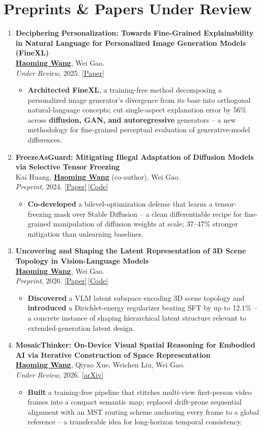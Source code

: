 \documentclass[11pt, letterpaper]{article}
\newenvironment{publist}{
  \begin{enumerate}[leftmargin=1.7em, itemsep=4pt, parsep=0pt, topsep=2pt, label=\arabic*.]
}{\end{enumerate}}
\newcommand{\impactbullet}[1]{%
  \par\vspace{1pt}%
  \begin{itemize}[leftmargin=1.2em, topsep=0pt, itemsep=0pt, parsep=0pt, partopsep=0pt]
    \item #1
  \end{itemize}}
\newcommand{\me}{\underline{\textbf{Haoming Wang}}}
\newcommand{\meco}{\underline{\textbf{Haoming Wang}} (co-author)}
\begin{document}
\section{Preprints \& Papers Under Review}

\begin{publist}
\item \textbf{Deciphering Personalization: Towards Fine-Grained Explainability in Natural Language for Personalized Image Generation Models (FineXL)}\\
\me, Wei Gao.\\
\textit{Under Review}, 2025. \href{https://haomingwang645.github.io/pdfs/finexl_paper.pdf}{[Paper]}
\impactbullet{\textbf{Architected FineXL}, a training-free method decomposing a personalized image generator's divergence from its base into orthogonal natural-language concepts; cut single-aspect explanation error by 56\% across \textbf{diffusion, GAN, and autoregressive} generators -- a new methodology for fine-grained perceptual evaluation of generative-model differences.}

\item \textbf{FreezeAsGuard: Mitigating Illegal Adaptation of Diffusion Models via Selective Tensor Freezing}\\
Kai Huang, \meco, Wei Gao.\\
\textit{Preprint}, 2024. \href{https://haomingwang645.github.io/pdfs/freezeasguard_paper.pdf}{[Paper]}\,\href{https://github.com/pittisl/FreezeAsGuard}{[Code]}
\impactbullet{\textbf{Co-developed} a bilevel-optimization defense that learns a tensor-freezing mask over Stable Diffusion -- a clean differentiable recipe for fine-grained manipulation of diffusion weights at scale; 37--47\% stronger mitigation than unlearning baselines.}

\item \textbf{Uncovering and Shaping the Latent Representation of 3D Scene Topology in Vision-Language Models}\\
\me, Wei Gao.\\
\textit{Preprint}, 2026. \href{https://haomingwang645.github.io/pdfs/arxiv26_vlm_latent_shaping.pdf}{[Paper]}\,\href{https://github.com/pittisl/vlm-latent-shaping}{[Code]}
\impactbullet{\textbf{Discovered} a VLM latent subspace encoding 3D scene topology and \textbf{introduced} a Dirichlet-energy regularizer beating SFT by up to 12.1\% -- a concrete instance of shaping hierarchical latent structure relevant to extended-generation latent design.}

\item \textbf{MosaicThinker: On-Device Visual Spatial Reasoning for Embodied AI via Iterative Construction of Space Representation}\\
\me, Qiyao Xue, Weichen Liu, Wei Gao.\\
\textit{Under Review}, 2026. \href{https://www.arxiv.org/abs/2602.07082}{[arXiv]}
\impactbullet{\textbf{Built} a training-free pipeline that stitches multi-view first-person video frames into a compact semantic map; replaced drift-prone sequential alignment with an MST routing scheme anchoring every frame to a global reference -- a transferable idea for long-horizon temporal consistency.}


\end{publist}
\end{document}
